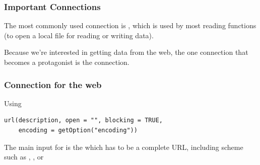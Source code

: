 \documentclass{beamer}\usepackage[]{graphicx}\usepackage[]{color}
\begin{document}

\begin{frame}
\frametitle{Important Connections}

\begin{block}{}
The most commonly used connection is , which is used by most reading functions (to open a local file for reading or writing data).
\end{block}

\begin{block}{ }
Because we're interested in getting data from the web, the one connection that becomes a protagonist is the  connection.
\end{block}

\end{frame}


\begin{frame}[fragile]
\frametitle{Connection for the web}

\begin{block}{Using }
 \begin{verbatim}
url(description, open = "", blocking = TRUE,
    encoding = getOption("encoding"))
 \end{verbatim}
\end{block}

The main input for  is the  which has to be a complete URL, including scheme such as , , or 

\end{frame}

\end{document}
